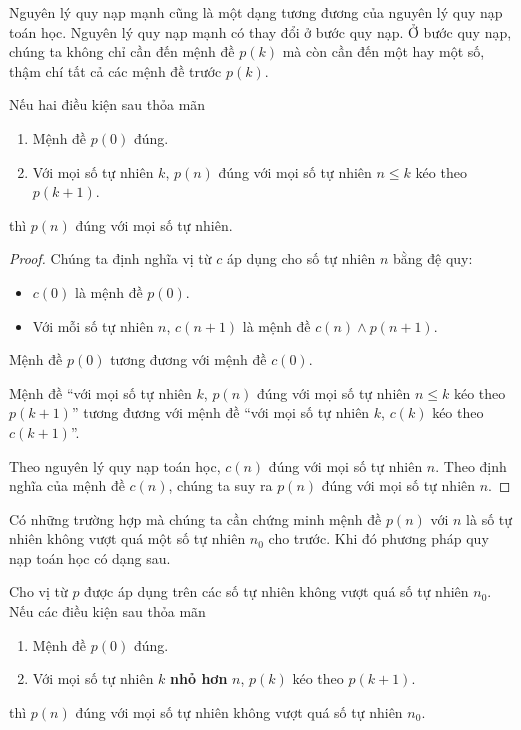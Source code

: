 Nguyên lý quy nạp mạnh cũng là một dạng tương đương của nguyên lý quy nạp toán học. Nguyên lý quy nạp mạnh có thay đổi ở bước quy nạp. Ở bước quy nạp, chúng ta không chỉ cần đến mệnh đề $p(k)$ mà còn cần đến một hay một số, thậm chí tất cả các mệnh đề trước $p(k)$.
\begin{theorem}
	Nếu hai điều kiện sau thỏa mãn
	\begin{enumerate}[label={(\roman*)}]
		\item Mệnh đề $p(0)$ đúng.
		\item Với mọi số tự nhiên $k$, $p(n)$ đúng với mọi số tự nhiên $n\leq k$ kéo theo $p(k+1)$.
	\end{enumerate}

	thì $p(n)$ đúng với mọi số tự nhiên.
\end{theorem}

\begin{proof}
	Chúng ta định nghĩa vị từ $c$ áp dụng cho số tự nhiên $n$ bằng đệ quy:
	\begin{itemize}
		\item $c(0)$ là mệnh đề $p(0)$.
		\item Với mỗi số tự nhiên $n$, $c(n+1)$ là mệnh đề $c(n)\wedge p(n+1)$.
	\end{itemize}

	Mệnh đề $p(0)$ tương đương với mệnh đề $c(0)$.

	Mệnh đề ``với mọi số tự nhiên $k$, $p(n)$ đúng với mọi số tự nhiên $n\leq k$ kéo theo $p(k+1)$'' tương đương với mệnh đề ``với mọi số tự nhiên $k$, $c(k)$ kéo theo $c(k+1)$''.

	Theo nguyên lý quy nạp toán học, $c(n)$ đúng với mọi số tự nhiên $n$. Theo định nghĩa của mệnh đề $c(n)$, chúng ta suy ra $p(n)$ đúng với mọi số tự nhiên $n$.
\end{proof}

Có những trường hợp mà chúng ta cần chứng minh mệnh đề $p(n)$ với $n$ là số tự nhiên không vượt quá một số tự nhiên $n_{0}$ cho trước. Khi đó phương pháp quy nạp toán học có dạng sau.
\begin{theorem}
	Cho vị từ $p$ được áp dụng trên các số tự nhiên không vượt quá số tự nhiên $n_{0}$. Nếu các điều kiện sau thỏa mãn
	\begin{enumerate}[label={(\roman*)}]
		\item Mệnh đề $p(0)$ đúng.
		\item Với mọi số tự nhiên $k$ \textbf{nhỏ hơn} $n$, $p(k)$ kéo theo $p(k+1)$.
	\end{enumerate}

	thì $p(n)$ đúng với mọi số tự nhiên không vượt quá số tự nhiên $n_{0}$.
\end{theorem}

